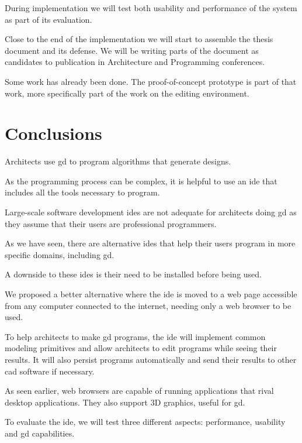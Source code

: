 \documentclass{./llncs2e/llncs}
\begin{document}
	During implementation we will test both usability and performance of the system as part of its evaluation.
	
	Close to the end of the implementation we will start to assemble the thesis document and its defense.
	We will be writing parts of the document as candidates to publication in Architecture and Programming conferences.
	
	Some work has already been done.
	The proof-of-concept prototype is part of that work, more specifically part of the work on the editing environment.
	

\section{Conclusions}
	Architects use \acf{gd} to program algorithms that generate designs.
	
	As the programming process can be complex, it is helpful to use an \ac{ide} that includes all the tools necessary to program.
	
	Large-scale software development \acp{ide} are not adequate for architects doing \ac{gd} as they assume that their users are professional programmers.
	
	As we have seen, there are alternative \acp{ide} that help their users program in more specific domains, including \ac{gd}.
	
	A downside to these \acp{ide} is their need to be installed before being used.
	
	We proposed a better alternative where the \ac{ide} is moved to a web page accessible from any computer connected to the internet, needing only a web browser to be used.
	
	To help architects to make \ac{gd} programs, the \ac{ide} will implement common modeling primitives and allow architects to edit programs while seeing their results.
	It will also persist programs automatically and send their results to other \ac{cad} software if necessary.
	
	As seen earlier, web browsers are capable of running applications that rival desktop applications.
	They also support 3D graphics, useful for \ac{gd}.
	
	To evaluate the \ac{ide}, we will test three different aspects: performance, usability and \ac{gd} capabilities.
	
\newpage
\end{document}
